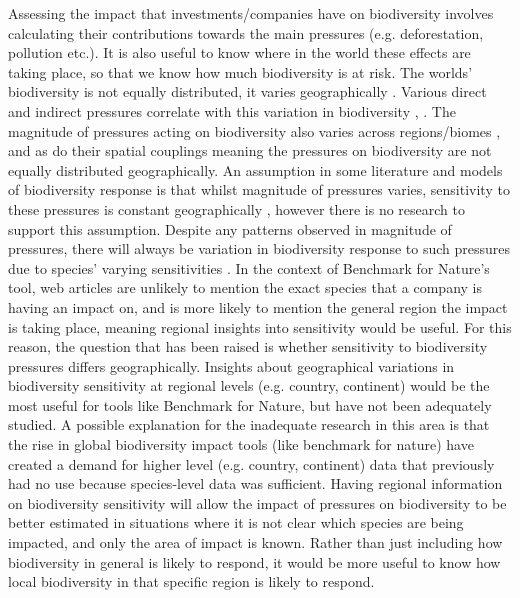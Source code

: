 \documentclass[11pt, a4paper, titlepage]{article}
\begin{document}
   	 Assessing the impact that investments/companies have on biodiversity involves calculating their contributions towards the main pressures (e.g. deforestation, pollution etc.). It is also useful to know where in the world these effects are taking place, so that we know how much biodiversity is at risk. The worlds' biodiversity is not equally distributed, it varies geographically \citep{gaston2000global} \citep{ricklefs2004comprehensive} \citep{mcrae2017diversity}. Various direct and indirect pressures correlate with this variation in biodiversity \citep{sunday2015species}, \citep{ament2019compatibility} \citep{Velde2022}. The magnitude of pressures acting on biodiversity also varies across regions/biomes \citep{millennium2005ecosystems} \citep{sala2000global}, and as do their spatial couplings \citep{bowler2020mapping} meaning the pressures on biodiversity are not equally distributed geographically. An assumption in some literature and models of biodiversity response is that whilst magnitude of pressures varies, sensitivity to these pressures is constant geographically \citep{sala2000global}, however there is no research to support this assumption. Despite any patterns observed in magnitude of pressures, there will always be variation in biodiversity response to such pressures due to species' varying sensitivities \citep{bowler2020mapping}. In the context of Benchmark for Nature's tool, web articles are unlikely to mention the exact species that a company is having an impact on, and is more likely to mention the general region the impact is taking place, meaning regional insights into sensitivity would be useful. For this reason, the question that has been raised is whether sensitivity to biodiversity pressures differs geographically. Insights about geographical variations in biodiversity sensitivity at regional levels (e.g. country, continent) would be the most useful for tools like Benchmark for Nature, but have not been adequately studied. A possible explanation for the inadequate research in this area is that the rise in global biodiversity impact tools (like benchmark for nature) have created a demand for higher level (e.g. country, continent) data that previously had no use because species-level data was sufficient. Having regional information on biodiversity sensitivity will allow the impact of pressures on biodiversity to be better estimated in situations where it is not clear which species are being impacted, and only the area of impact is known. Rather than just including how biodiversity in general is likely to respond, it would be more useful to know how local biodiversity in that specific region is likely to respond.  \newline
   	 
\end{document}
